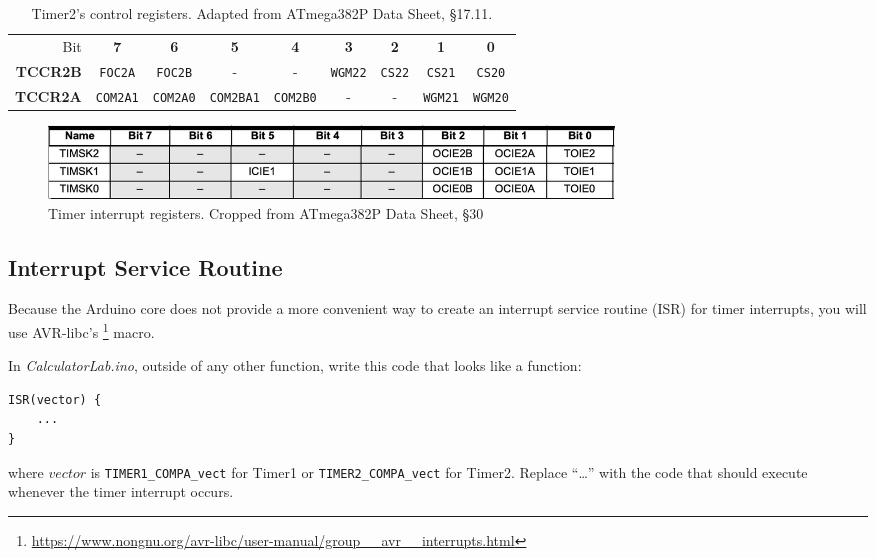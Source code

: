 \begin{table}[p]
    \centering \small
    \begin{tabular}{|r||c|c|c|c|c|c|c|c||}
        \hline
        Bit             & \textbf{7}        & \textbf{6}        & \textbf{5}        & \textbf{4}        & \textbf{3}        & \textbf{2}    & \textbf{1}        & \textbf{0}        \\ \cline{2-9}
        \textbf{TCCR2B} & \texttt{FOC2A}    & \texttt{FOC2B}    & -                 & -                 & \texttt{WGM22}    & \texttt{CS22} & \texttt{CS21}     & \texttt{CS20}     \\
        \textbf{TCCR2A} & \texttt{COM2A1}   & \texttt{COM2A0}   & \texttt{COM2BA1}  & \texttt{COM2B0}   & -                 & -             & \texttt{WGM21}    & \texttt{WGM20}    \\ \hline
    \end{tabular}
    \caption{Timer2's control registers. \tiny Adapted from ATmega382P Data Sheet, §17.11. \label{table:Timer2Control}}
\end{table}

\begin{figure}[p]
    \centering
    \includegraphics[width=15cm]{TimerInterruptRegisters}
    \caption{Timer interrupt registers. \tiny Cropped from ATmega382P Data Sheet, §30 \label{fig:TimerInterruptRegisters}}
\end{figure}


\subsection{Interrupt Service Routine}

Because the Arduino core does not provide a more convenient way to create an
interrupt service routine (ISR) for timer interrupts, you will use AVR-libc's
\footnote{\url{https://www.nongnu.org/avr-libc/user-manual/group__avr__interrupts.html}}
macro.

In \textit{CalculatorLab.ino}, outside of any other function, write this code that looks like a function:

\begin{lstlisting}
ISR(vector) {
    ...
}
\end{lstlisting}

where $vector$ is \lstinline{TIMER1_COMPA_vect} for Timer1 or
\lstinline{TIMER2_COMPA_vect} for Timer2. Replace ``\dots'' with the code that
should execute whenever the timer interrupt occurs.

